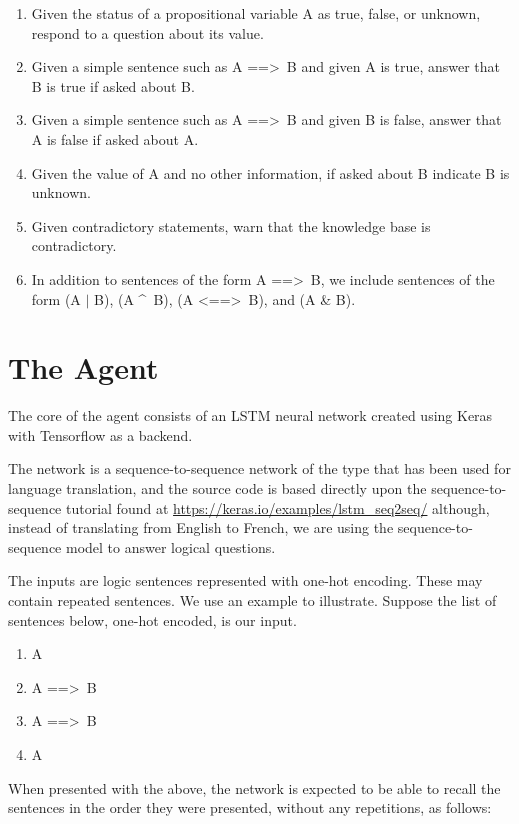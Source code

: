 \documentclass{article}
\begin{document}
\begin{enumerate}
	\item Given the status of a propositional variable A as true, false, or unknown, respond to a question about its value.
	\item Given a simple sentence such as A ==\textgreater \, B and given A is true, answer that B is true if asked about B.
	\item Given a simple sentence such as A ==\textgreater \, B and given B is false, answer that A is false if asked about A.
	\item Given the value of A and no other information, if asked about B indicate B is unknown.
	\item Given contradictory statements, warn that the knowledge base is contradictory.
	\item In addition to sentences of the form A ==\textgreater \, B, we include sentences of the form (A $|$ B), (A \textasciicircum \, B), (A \textless ==\textgreater \, B), and (A \&  B).
\end{enumerate}


\section{The Agent}
\label{the_agent}
The core of the agent consists of an LSTM neural network created
using Keras \cite{chollet2015keras}
with Tensorflow \cite{tensorflow2015-whitepaper}
as a backend.

The network is a sequence-to-sequence network of the type that has been used for language translation, and the source code is based directly upon the sequence-to-sequence tutorial found at \url{https://keras.io/examples/lstm_seq2seq/} although, instead of translating from English to French, we are using the sequence-to-sequence model to answer logical questions.

The inputs are logic sentences represented with one-hot encoding. These may contain repeated sentences. We use an example to illustrate. Suppose the list of sentences below, one-hot encoded, is our input.

\begin{enumerate}
	\item A
	\item A ==\textgreater \, B
	\item A ==\textgreater \, B
	\item A
\end{enumerate}

When presented with the above, the network is expected to be able to recall the sentences in the order they were presented, without any repetitions, as follows:
\end{document}
